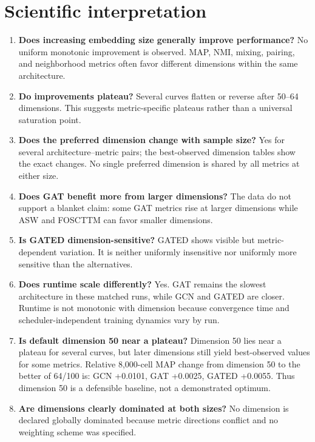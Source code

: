 \documentclass[10pt]{article}
\begin{document}
\section{Scientific interpretation}
\begin{enumerate}
\item \textbf{Does increasing embedding size generally improve performance?} No uniform monotonic improvement is observed. MAP, NMI, mixing, pairing, and neighborhood metrics often favor different dimensions within the same architecture.
\item \textbf{Do improvements plateau?} Several curves flatten or reverse after 50--64 dimensions. This suggests metric-specific plateaus rather than a universal saturation point.
\item \textbf{Does the preferred dimension change with sample size?} Yes for several architecture--metric pairs; the best-observed dimension tables show the exact changes. No single preferred dimension is shared by all metrics at either size.
\item \textbf{Does GAT benefit more from larger dimensions?} The data do not support a blanket claim: some GAT metrics rise at larger dimensions while ASW and FOSCTTM can favor smaller dimensions.
\item \textbf{Is GATED dimension-sensitive?} GATED shows visible but metric-dependent variation. It is neither uniformly insensitive nor uniformly more sensitive than the alternatives.
\item \textbf{Does runtime scale differently?} Yes. GAT remains the slowest architecture in these matched runs, while GCN and GATED are closer. Runtime is not monotonic with dimension because convergence time and scheduler-independent training dynamics vary by run.
\item \textbf{Is default dimension 50 near a plateau?} Dimension 50 lies near a plateau for several curves, but later dimensions still yield best-observed values for some metrics. Relative 8,000-cell MAP change from dimension 50 to the better of 64/100 is: GCN +0.0101, GAT +0.0025, GATED +0.0055. Thus dimension 50 is a defensible baseline, not a demonstrated optimum.
\item \textbf{Are dimensions clearly dominated at both sizes?} No dimension is declared globally dominated because metric directions conflict and no weighting scheme was specified.
\end{enumerate}
\end{document}
